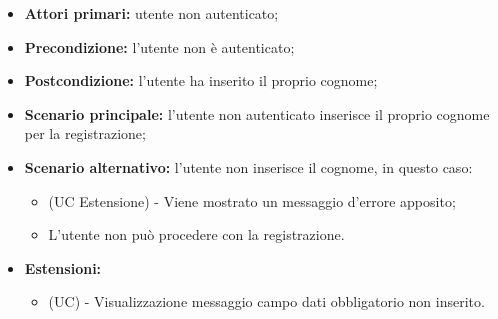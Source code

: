 \begin{itemize}
	\item \textbf{Attori primari:} utente non autenticato;
	\item \textbf{Precondizione:} l'utente non è autenticato;
	\item \textbf{Postcondizione:} l'utente ha inserito il proprio cognome;
	\item \textbf{Scenario principale:} l'utente non autenticato inserisce il proprio cognome per la registrazione;
	\item \textbf{Scenario alternativo:} l'utente non inserisce il cognome, in questo caso:
	\begin{itemize}
		\item (UC Estensione) - Viene mostrato un messaggio d'errore apposito;
		\item L'utente non può procedere con la registrazione.
	\end{itemize}
	\item \textbf{Estensioni:}
	\begin{itemize}
		\item (UC) - Visualizzazione messaggio campo dati obbligatorio non inserito.
	\end{itemize}
\end{itemize}

